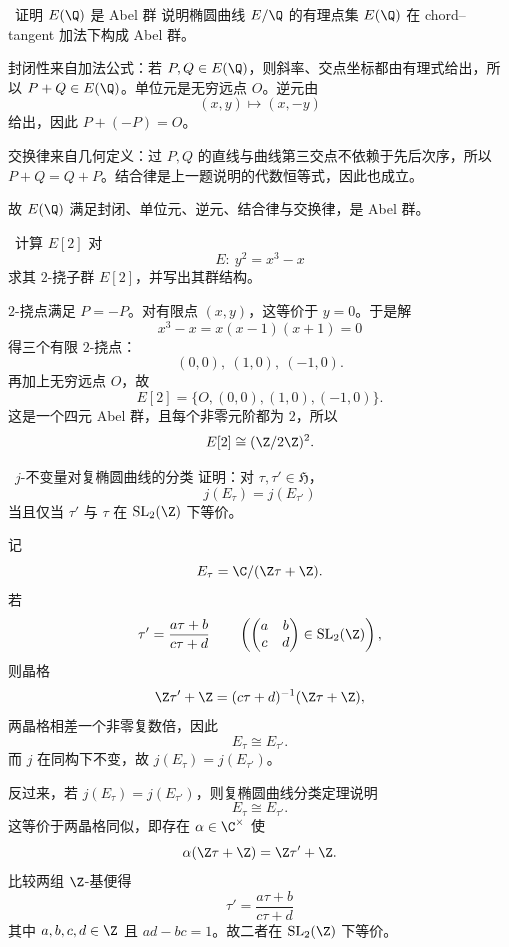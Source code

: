 \begin{problem}{\medium\ 证明 $E(\Q)$ 是 Abel 群}
说明椭圆曲线 $E/\Q$ 的有理点集 $E(\Q)$ 在 chord--tangent 加法下构成 Abel 群。
\end{problem}
\begin{solution}
封闭性来自加法公式：若 $P,Q\in E(\Q)$，则斜率、交点坐标都由有理式给出，所以 $P+Q\in E(\Q)$。单位元是无穷远点 $O$。逆元由
\[
(x,y)\mapsto (x,-y)
\]
给出，因此 $P+(-P)=O$。

交换律来自几何定义：过 $P,Q$ 的直线与曲线第三交点不依赖于先后次序，所以 $P+Q=Q+P$。结合律是上一题说明的代数恒等式，因此也成立。

故 $E(\Q)$ 满足封闭、单位元、逆元、结合律与交换律，是 Abel 群。
\end{solution}

\begin{problem}{\medium\ 计算 $E[2]$}
对
\[
E:\ y^2=x^3-x
\]
求其 $2$-挠子群 $E[2]$，并写出其群结构。
\end{problem}
\begin{solution}
$2$-挠点满足 $P=-P$。对有限点 $(x,y)$，这等价于 $y=0$。于是解
\[
x^3-x=x(x-1)(x+1)=0
\]
得三个有限 $2$-挠点：
\[
(0,0),\ (1,0),\ (-1,0).
\]
再加上无穷远点 $O$，故
\[
E[2]=\{O,(0,0),(1,0),(-1,0)\}.
\]
这是一个四元 Abel 群，且每个非零元阶都为 $2$，所以
\[
E[2]\cong (\Z/2\Z)^2.
\]
\end{solution}

\begin{problem}{\medium\ $j$-不变量对复椭圆曲线的分类}
证明：对 $\tau,\tau'\in\mathfrak{H}$，
\[
j(E_\tau)=j(E_{\tau'})
\]
当且仅当 $\tau'$ 与 $\tau$ 在 $\mathrm{SL}_2(\Z)$ 下等价。
\end{problem}
\begin{solution}
记
\[
E_\tau=\C/(\Z\tau+\Z).
\]
若
\[
\tau'=\frac{a\tau+b}{c\tau+d}\qquad
\left(\begin{pmatrix}a&b\\c&d\end{pmatrix}\in \mathrm{SL}_2(\Z)\right),
\]
则晶格
\[
\Z\tau'+\Z=(c\tau+d)^{-1}(\Z\tau+\Z),
\]
两晶格相差一个非零复数倍，因此
\[
E_\tau\cong E_{\tau'}.
\]
而 $j$ 在同构下不变，故 $j(E_\tau)=j(E_{\tau'})$。

反过来，若 $j(E_\tau)=j(E_{\tau'})$，则复椭圆曲线分类定理说明
\[
E_\tau\cong E_{\tau'}.
\]
这等价于两晶格同似，即存在 $\alpha\in\C^\times$ 使
\[
\alpha(\Z\tau+\Z)=\Z\tau'+\Z.
\]
比较两组 $\Z$-基便得
\[
\tau'=\frac{a\tau+b}{c\tau+d}
\]
其中 $a,b,c,d\in\Z$ 且 $ad-bc=1$。故二者在 $\mathrm{SL}_2(\Z)$ 下等价。
\end{solution}

